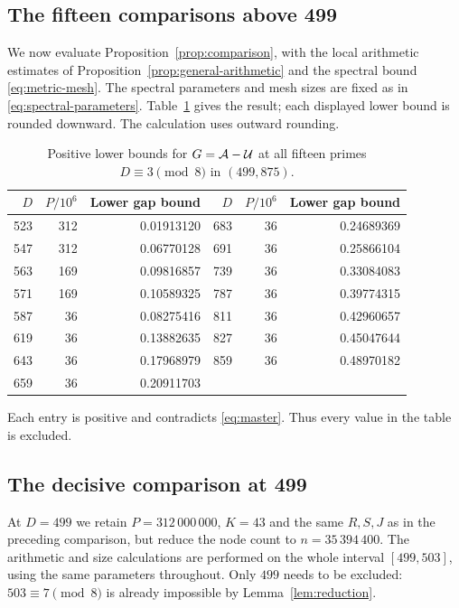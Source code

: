\subsection{The fifteen comparisons above 499}
We now evaluate Proposition~\ref{prop:comparison}, with the local arithmetic
estimates of Proposition~\ref{prop:general-arithmetic} and the spectral bound
\eqref{eq:metric-mesh}. The spectral parameters and mesh sizes are fixed as
in \eqref{eq:spectral-parameters}. Table~\ref{tab:candidates} gives the result;
each displayed lower bound is rounded downward. The calculation uses outward rounding.
\begin{table}[ht]
\centering
\begin{tabular}{rrr@{\qquad}rrr}
\toprule
$D$ & $P/10^6$ & Lower gap bound & $D$ & $P/10^6$ & Lower gap bound\\
\midrule
523&312&0.01913120 &683&36&0.24689369\\
547&312&0.06770128 &691&36&0.25866104\\
563&169&0.09816857 &739&36&0.33084083\\
571&169&0.10589325 &787&36&0.39774315\\
587&36&0.08275416 &811&36&0.42960657\\
619&36&0.13882635 &827&36&0.45047644\\
643&36&0.17968979 &859&36&0.48970182\\
659&36&0.20911703 &&&\\
\bottomrule
\end{tabular}
\caption{Positive lower bounds for $G=\mathcal A-\mathcal U$ at all fifteen primes
$D\equiv3\pmod8$ in $(499,875)$.}
\label{tab:candidates}
\end{table}
Each entry is positive and contradicts \eqref{eq:master}. Thus every value in
the table is excluded.

\subsection{The decisive comparison at 499}
At $D=499$ we retain $P=312\,000\,000$, $K=43$ and the same $R,S,J$ as in
the preceding comparison, but reduce the node count to $n=35\,394\,400$.
The arithmetic and size calculations are performed on the whole interval
$[499,503]$, using the same parameters throughout. Only $499$ needs to be excluded: $503\equiv7\pmod8$ is already
impossible by Lemma~\ref{lem:reduction}.

